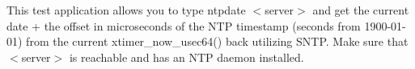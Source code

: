 This test application allows you to type {\ttfamily ntpdate $<$server$>$} and get the current date + the offset in microseconds of the N\+TP timestamp (seconds from 1900-\/01-\/01) from the current {\ttfamily xtimer\+\_\+now\+\_\+usec64()} back utilizing S\+N\+TP. Make sure that {\ttfamily $<$server$>$} is reachable and has an N\+TP daemon installed. 